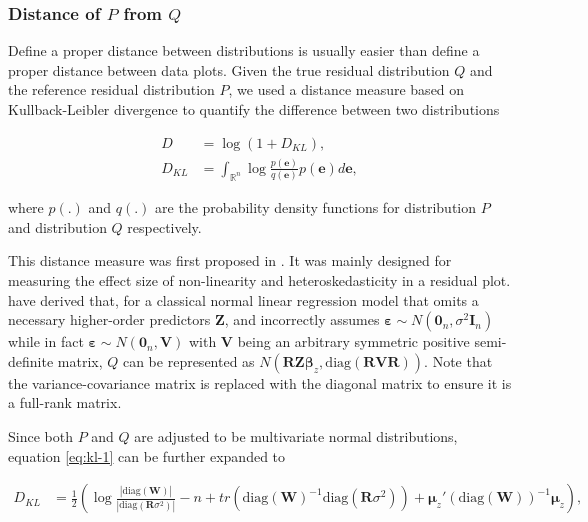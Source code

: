 \documentclass[]{interact}
\theoremstyle{plain}%
\theoremstyle{definition}
\theoremstyle{remark}
\begin{document}
\subsubsection{\texorpdfstring{Distance of \(P\) from
\(Q\)}{Distance of P from Q}}\label{distance-of-p-from-q}

Define a proper distance between distributions is usually easier than
define a proper distance between data plots. Given the true residual
distribution \(Q\) and the reference residual distribution \(P\), we
used a distance measure based on Kullback-Leibler divergence
\citep{kullback1951information} to quantify the difference between two
distributions

\begin{align}
\label{eq:kl-0}
D &= \log\left(1 + D_{KL}\right), \\
\label{eq:kl-1}
D_{KL} &= \int_{\mathbb{R}^{n}}\log\frac{p(\boldsymbol{e})}{q(\boldsymbol{e})}p(\boldsymbol{e})d\boldsymbol{e},
\end{align}

\noindent where \(p(.)\) and \(q(.)\) are the probability density
functions for distribution \(P\) and distribution \(Q\) respectively.

This distance measure was first proposed in \citet{li2023plot}. It was
mainly designed for measuring the effect size of non-linearity and
heteroskedasticity in a residual plot. \citet{li2023plot} have derived
that, for a classical normal linear regression model that omits a
necessary higher-order predictors \(\boldsymbol{Z}\), and incorrectly
assumes
\(\boldsymbol{\varepsilon} \sim N(\boldsymbol{0}_n,\sigma^2\boldsymbol{I}_n)\)
while in fact
\(\boldsymbol{\varepsilon} \sim N(\boldsymbol{0}_n, \boldsymbol{V})\)
with \(\boldsymbol{V}\) being an arbitrary symmetric positive
semi-definite matrix, \(Q\) can be represented as
\(N(\boldsymbol{R}\boldsymbol{Z}\boldsymbol{\beta}_z, \text{diag}(\boldsymbol{R}\boldsymbol{V}\boldsymbol{R}))\).
Note that the variance-covariance matrix is replaced with the diagonal
matrix to ensure it is a full-rank matrix.

Since both \(P\) and \(Q\) are adjusted to be multivariate normal
distributions, equation \ref{eq:kl-1} can be further expanded to

\begin{align}
\label{eq:kl-2}
D_{KL} &= \frac{1}{2}\left(\log\frac{|\text{diag}(\boldsymbol{W})|}{|\text{diag}(\boldsymbol{R}\sigma^2)|} - n + tr(\text{diag}(\boldsymbol{W})^{-1}\text{diag}(\boldsymbol{R}\sigma^2)) + \boldsymbol{\mu}_z'(\text{diag}(\boldsymbol{W}))^{-1}\boldsymbol{\mu}_z\right),
\end{align}
\end{document}

